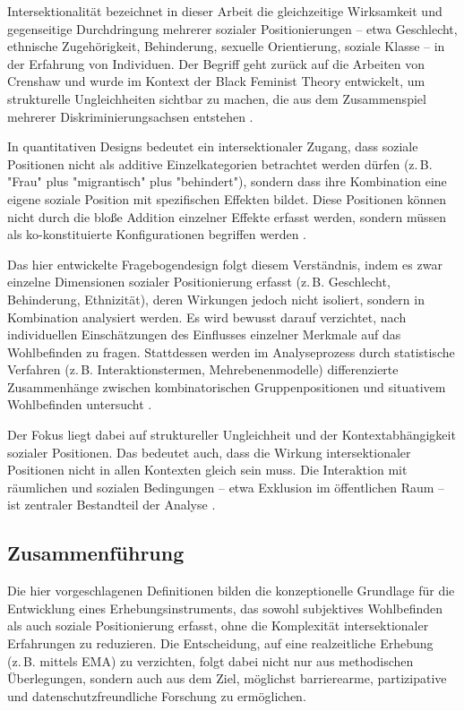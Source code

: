 Intersektionalität bezeichnet in dieser Arbeit die gleichzeitige Wirksamkeit und gegenseitige Durchdringung mehrerer sozialer Positionierungen – etwa Geschlecht, ethnische Zugehörigkeit, Behinderung, sexuelle Orientierung, soziale Klasse – in der Erfahrung von Individuen. Der Begriff geht zurück auf die Arbeiten von Crenshaw und wurde im Kontext der Black Feminist Theory entwickelt, um strukturelle Ungleichheiten sichtbar zu machen, die aus dem Zusammenspiel mehrerer Diskriminierungsachsen entstehen \parencite{crenshawMappingMarginsIntersectionality1991, bauerIntersectionalityQuantitativeResearch2021}.

In quantitativen Designs bedeutet ein intersektionaler Zugang, dass soziale Positionen nicht als additive Einzelkategorien betrachtet werden dürfen (z. B. "Frau" plus "migrantisch" plus "behindert"), sondern dass ihre Kombination eine eigene soziale Position mit spezifischen Effekten bildet. Diese Positionen können nicht durch die bloße Addition einzelner Effekte erfasst werden, sondern müssen als ko-konstituierte Konfigurationen begriffen werden \parencite{hancock2007, bauerIntersectionalityQuantitativeResearch2021}.

Das hier entwickelte Fragebogendesign folgt diesem Verständnis, indem es zwar einzelne Dimensionen sozialer Positionierung erfasst (z. B. Geschlecht, Behinderung, Ethnizität), deren Wirkungen jedoch nicht isoliert, sondern in Kombination analysiert werden. Es wird bewusst darauf verzichtet, nach individuellen Einschätzungen des Einflusses einzelner Merkmale auf das Wohlbefinden zu fragen. Stattdessen werden im Analyseprozess durch statistische Verfahren (z. B. Interaktionstermen, Mehrebenenmodelle) differenzierte Zusammenhänge zwischen kombinatorischen Gruppenpositionen und situativem Wohlbefinden untersucht \parencite{bauerIntersectionalityQuantitativeResearch2021}.

Der Fokus liegt dabei auf struktureller Ungleichheit und der Kontextabhängigkeit sozialer Positionen. Das bedeutet auch, dass die Wirkung intersektionaler Positionen nicht in allen Kontexten gleich sein muss. Die Interaktion mit räumlichen und sozialen Bedingungen – etwa Exklusion im öffentlichen Raum – ist zentraler Bestandteil der Analyse \parencite{rodo-de-zarateDevelopingGeographiesIntersectionality2014}.

\subsection*{Zusammenführung}

Die hier vorgeschlagenen Definitionen bilden die konzeptionelle Grundlage für die Entwicklung eines Erhebungsinstruments, das sowohl subjektives Wohlbefinden als auch soziale Positionierung erfasst, ohne die Komplexität intersektionaler Erfahrungen zu reduzieren. Die Entscheidung, auf eine realzeitliche Erhebung (z. B. mittels EMA) zu verzichten, folgt dabei nicht nur aus methodischen Überlegungen, sondern auch aus dem Ziel, möglichst barrierearme, partizipative und datenschutzfreundliche Forschung zu ermöglichen.
